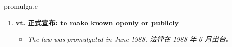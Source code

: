 
\begin{frame}
{\huge promulgate}
\begin{center}
\begin{enumerate}\Large
  \item \textbf{vt. 正式宣布: to make known openly or publicly}
  \begin{itemize}
    \item \em{\Large{The law was promulgated in June 1988. 法律在 1988 年 6 月出台。}}
  \end{itemize}
\end{enumerate}
\end{center}
\end{frame}
